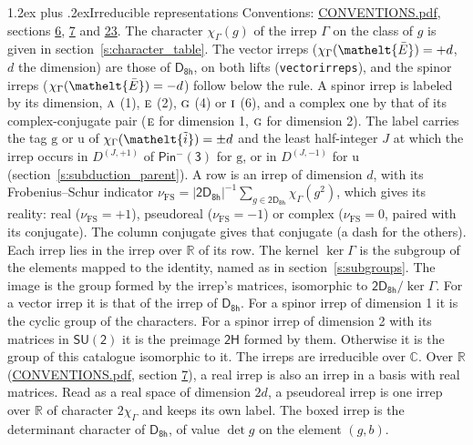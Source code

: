 \documentclass[10pt,a4paper]{article}
\makeatletter
\renewcommand\section{\@startsection{section}{1}{\z@}{-3ex plus -1ex minus -.2ex}%
  {1.2ex plus .2ex}{\normalfont\large\sffamily\bfseries\color{parttitle}}}
\numberwithin{equation}{section}
\newcommand{\eltfont}[1]{{\let\sigma\eltsigma\mathelt{#1}}}
\newcommand{\grp}[1]{\mathsf{#1}}
\newcommand{\irr}[1]{\text{\normalfont\scshape #1}}
\newcommand{\elt}[1]{\eltfont{#1}}
\newcommand{\ptag}[1]{\mathrm{#1}}
\newcommand{\irrJp}[2]{D^{(#1,#2)}}
\newcommand{\irchar}[1]{\chi_{#1}}
\newcommand{\fsind}{\nu_{\mathrm{FS}}}
\newcommand{\barred}[1]{\bar{#1}}
\newcommand{\lift}[1]{\tilde{#1}}
\makeatother
\begin{document}
\section{Irreducible representations}\label{s:irreps}
Conventions: \href{../../CONVENTIONS.pdf}{CONVENTIONS.pdf}, sections \href{../../../rotation/CONVENTIONS.pdf\#conv.6}{6}, \href{../../../rotation/CONVENTIONS.pdf\#conv.7}{7} and \href{../../CONVENTIONS.pdf\#conv.23}{23}.
\leavevmode\label{n:function.character}\label{n:irrep.Gamma}The character $\irchar{\Gamma}(g)$ of the irrep $\Gamma$ on the class of $g$ is given in section~\ref{s:character_table}. \label{n:index.dimension}The vector irreps ($\irchar{\Gamma}(\elt{\barred{E}}) = +d$, $d$ the dimension) are those of \href{../../../rotation/data/pdf/D8h.pdf}{$\grp{D_{8h}}$}, on both lifts (\texttt{vectorirreps}), and the spinor irreps ($\irchar{\Gamma}(\elt{\barred{E}}) = -d$) follow below the rule. A spinor irrep is labeled by its dimension, $\irr{a}$ (1), $\irr{e}$ (2), $\irr{g}$ (4) or $\irr{i}$ (6), and a complex one by that of its complex-conjugate pair ($\irr{e}$ for dimension 1, $\irr{g}$ for dimension 2). The label carries the tag $\ptag{g}$ or $\ptag{u}$ of $\irchar{\Gamma}(\elt{\lift{i}}) = \pm d$ and the least half-integer $J$ at which the irrep occurs in $\irrJp{J}{+1}$ of $\grp{Pin^{-}(3)}$ for $\ptag{g}$, or in $\irrJp{J}{-1}$ for $\ptag{u}$ (section~\ref{s:subduction_parent}).
\leavevmode\label{n:index.frobenius}\label{n:head.irrep}\label{n:head.reality}A row is an irrep of dimension $d$, with its Frobenius--Schur indicator $\fsind = |\grp{2D_{8h}}|^{-1}\allowbreak\sum_{g\in\grp{2D_{8h}}}\irchar{\Gamma}(g^2)$, which gives its reality: real ($\fsind = +1$), pseudoreal ($\fsind = -1$) or complex ($\fsind = 0$, paired with its conjugate). \label{n:head.conjugate}The column conjugate gives that conjugate (a dash for the others). \label{n:head.over.real}Each irrep lies in the irrep over $\mathbb{R}$ of its row. \label{n:head.kernel}The kernel $\ker\Gamma$ is the subgroup of the elements mapped to the identity, named as in section~\ref{s:subgroups}. \label{n:head.image}The image is the group formed by the irrep's matrices, isomorphic to $\grp{2D_{8h}}/\ker\Gamma$. For a vector irrep it is that of the irrep of \href{../../../rotation/data/pdf/D8h.pdf}{$\grp{D_{8h}}$}. For a spinor irrep of dimension 1 it is the cyclic group of the characters. For a spinor irrep of dimension 2 with its matrices in $\grp{SU(2)}$ it is the preimage $\grp{2H}$ formed by them. Otherwise it is the group of this catalogue isomorphic to it. The irreps are irreducible over $\mathbb{C}$. Over $\mathbb{R}$ (\href{../../CONVENTIONS.pdf}{CONVENTIONS.pdf}, section \href{../../../rotation/CONVENTIONS.pdf\#conv.7}{7}), a real irrep is also an irrep in a basis with real matrices. Read as a real space of dimension $2d$, a pseudoreal irrep is one irrep over $\mathbb{R}$ of character $2\irchar{\Gamma}$ and keeps its own label. \label{n:mark.determinant}The boxed irrep is the determinant character of \href{../../../rotation/data/pdf/D8h.pdf}{$\grp{D_{8h}}$}, of value $\det g$ on the element $(g, b)$.
\end{document}
